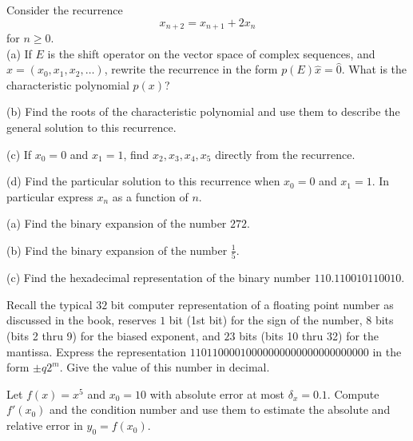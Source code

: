 \documentclass[12pt]{article}
\begin{document}
 
    
\newpage
{}
Consider the recurrence 
$$
x_{n+2}=x_{n+1}+2x_n
$$
for $n \geq 0$. \\

\noindent
(a) If $E$ is the shift operator on the vector space of complex sequences, and $\hat{x}=(x_0,x_1,x_2,\dots)$, rewrite the recurrence in the form 
$p(E)\hat{x}=\hat{0}$. What is the characteristic polynomial $p(x)$? 

\vspace{2 in}

\noindent
(b) Find the roots of the characteristic polynomial and use them to describe the general solution to this recurrence. 

\vspace{1.5in}

\noindent
(c) If $x_0=0$ and $x_1=1$, find $x_2, x_3, x_4, x_5$ directly from the recurrence. \\

\vspace{1in}

\noindent
(d) Find the particular solution to this recurrence when $x_0=0$ and $x_1=1$. In particular express $x_n$ as a function of $n$.

\newpage

(a) Find the binary expansion of the number $272$. \\

\vspace{3 in}

\noindent
(b) Find the binary expansion of the number $\frac{1}{5}$. \\

\vspace{3 in}

\noindent
(c) Find the hexadecimal representation of the binary number $110.110010110010$.

\newpage

\noindent
Recall the typical $32$ bit computer representation of a floating point number as discussed in the book, reserves $1$ bit (1st bit) for the sign of the number, 
$8$ bits (bits 2 thru 9) for the biased exponent, and $23$ bits (bits 10 thru 32) for the mantissa. Express the representation 
$11011000010000000000000000000000$ in the form $\pm q 2^m$. Give the value of this number in decimal.

\vspace{2.5 in}

\noindent
Let $f(x)=x^5$ and $x_0=10$ with absolute error at most $\delta_x=0.1$. Compute $f'(x_0)$ and the condition number and use them to estimate 
the absolute and relative error in $y_0=f(x_0)$. 
\end{document}
